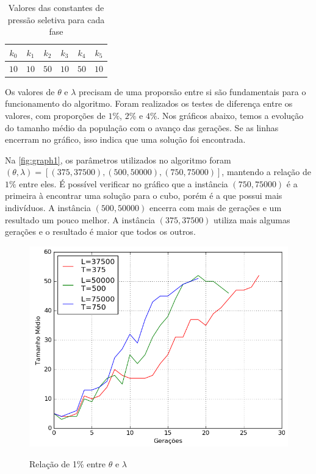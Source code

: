 \documentclass[12pt]{article}
\begin{document}
      \begin{table}[ht]
      \centering
      \caption{Valores das constantes de pressão seletiva para cada fase} \label{tab_const}
      \begin{tabular}{|c|c|c|c|c|c|}
        \hline
        \textbf{$k_0$} & \textbf{$k_1$} & \textbf{$k_2$} & \textbf{$k_3$} & \textbf{$k_4$} & \textbf{$k_5$} \\ \hline
        $10$ & $10$ & $50$ & $10$ & $50$ & $10$ \\ \hline
      \end{tabular}
    \end{table}

  Os valores de $\theta$ e $\lambda$ precisam de uma proporsão entre si são fundamentais para o funcionamento do algoritmo. Foram realizados os testes de diferença entre os valores, com proporções de $1\%$, $2\%$ e $4\%$. Nos gráficos abaixo, temos a evolução do tamanho médio da população com o avanço das gerações. Se as linhas encerram no gráfico, isso indica que uma solução foi encontrada.

  Na \autoref{fig:graph1}, os parâmetros utilizados no algoritmo foram $(\theta, \lambda)=[(375, 37500),(500,50000),(750,75000)]$, mantendo a relação de $1\%$ entre eles. É possível verificar no gráfico que a instância $(750,75000)$ é a primeira à encontrar uma solução para o cubo, porém é a que possui mais indivíduos. A instância $(500,50000)$ encerra com mais de gerações e um resultado um pouco melhor. A instância $(375, 37500)$ utiliza mais algumas gerações e o resultado é maior que todos os outros.

  \begin{figure}[!ht]
    \centering
    \caption{Relação de 1\% entre $\theta$ e $\lambda$}
    \includegraphics[scale=0.6]{images/1_100.png}
    \label{fig:graph1}
  \end{figure}
\end{document}
